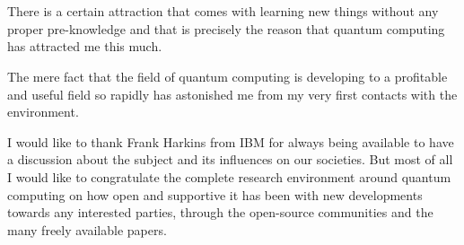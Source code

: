 
\chapter*{}
\label{ch:voorwoord}


There is a certain attraction that comes with learning new things without any proper pre-knowledge and that is precisely the reason that quantum computing has attracted me this much. 

The mere fact that the field of quantum computing is developing to a profitable and useful field so rapidly has astonished me from my very first contacts with the environment.

 I would like to thank Frank Harkins from IBM for always being available to have a discussion about the subject and its influences on our societies. But most of all I would like to congratulate the complete research environment around quantum computing on how open and supportive it has been with new developments towards any interested parties, through the  open-source communities and the many freely available papers.

